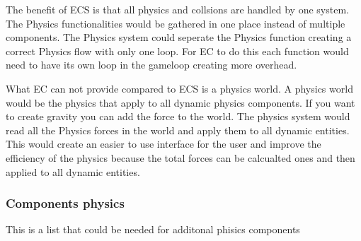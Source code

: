 \documentclass{projdoc}
\begin{document}
The benefit of ECS is that all physics and collsions are handled by one system. The
Physics functionalities would be gathered in one place instead of multiple
components. The Physics system could seperate the Physics function creating a correct
Physics flow with only one loop. For EC to do this each function would need to have
its own loop in the gameloop creating more overhead.

What EC can not provide compared to ECS is a physics world. A physics world would be
the physics that apply to all dynamic physics components. If you want to create
gravity you can add the force to the world. The physics system would read all the
Physics forces in the world and apply them to all dynamic entities. This would create
an easier to use interface for the user and improve the efficiency of the physics
because the total forces can be calcualted ones and then applied to all dynamic
entities.

\subsubsection{Components physics}
This is a list that could be needed for additonal phisics components
\end{document}
